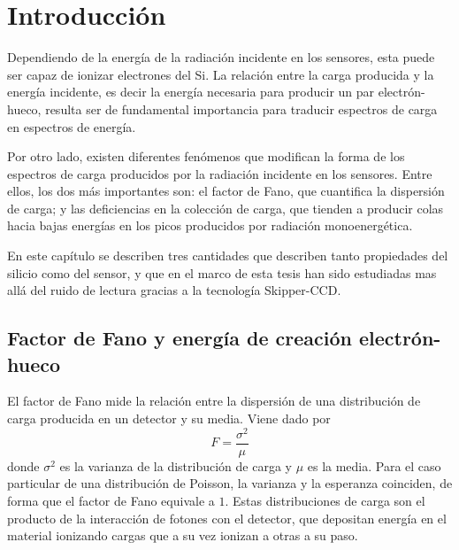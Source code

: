 \newpage
{}  %
\setcounter{page}{1}    %

\chapter{Introducción}
\noindent Dependiendo de la energía de la radiación incidente en los sensores, esta puede ser capaz de ionizar electrones del Si.  
La relación entre la carga producida y la energía incidente, es decir la energía necesaria para producir un par electrón-hueco, resulta ser de fundamental importancia para traducir espectros de carga en espectros de energía.

Por otro lado, existen diferentes fenómenos que modifican la forma de los espectros de carga producidos por la radiación incidente en los sensores. Entre ellos, los dos más importantes son: el factor de Fano, que cuantifica la dispersión de carga; y las deficiencias en la colección de carga, que tienden a producir colas hacia bajas energías en los picos producidos por radiación monoenergética.

En este capítulo se describen tres cantidades que describen tanto propiedades del silicio como del sensor, y que en el marco de esta tesis han sido estudiadas mas allá del ruido de lectura gracias a la tecnología Skipper-CCD.

\section{Factor de Fano y energía de creación electrón-hueco}
\noindent El factor de Fano mide la relación entre la dispersión de una distribución de carga producida en un detector y su media. Viene dado por
\begin{equation*}
    F = \frac{\sigma^{2}}{\mu}
\end{equation*}
donde $\sigma^{2}$ es la varianza de la distribución de carga y $\mu$ es la media. 
Para el caso particular de una distribución de Poisson, la varianza y la esperanza coinciden, de forma que el factor de Fano equivale a $1$. 
Estas distribuciones de carga son el producto de la interacción de fotones con el detector, que depositan energía en el material ionizando cargas que a su vez ionizan a otras a su paso. 

